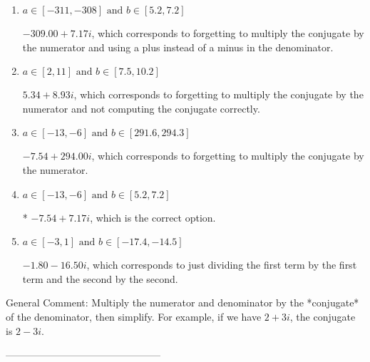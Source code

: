 \documentclass{extbook}[14pt]
\begin{document}
\begin{enumerate}[label=\Alph*.] 
\item $ a \in [-311, -308] \text{ and } b \in [5.2, 7.2] $ 

  $-309.00  + 7.17 i$, which corresponds to forgetting to multiply the conjugate by the numerator and using a plus instead of a minus in the denominator. 
\item $ a \in [2, 11] \text{ and } b \in [7.5, 10.2] $ 

  $5.34  + 8.93 i$, which corresponds to forgetting to multiply the conjugate by the numerator and not computing the conjugate correctly. 
\item $ a \in [-13, -6] \text{ and } b \in [291.6, 294.3] $ 

  $-7.54  + 294.00 i$, which corresponds to forgetting to multiply the conjugate by the numerator. 
\item $ a \in [-13, -6] \text{ and } b \in [5.2, 7.2] $ 

 * $-7.54  + 7.17 i$, which is the correct option. 
\item $ a \in [-3, 1] \text{ and } b \in [-17.4, -14.5] $ 

  $-1.80  - 16.50 i$, which corresponds to just dividing the first term by the first term and the second by the second. 
\end{enumerate} 
 
General Comment: Multiply the numerator and denominator by the *conjugate* of the denominator, then simplify. For example, if we have $2+3i$, the conjugate is $2-3i$.

-----------------------------------------------
\end{document}
